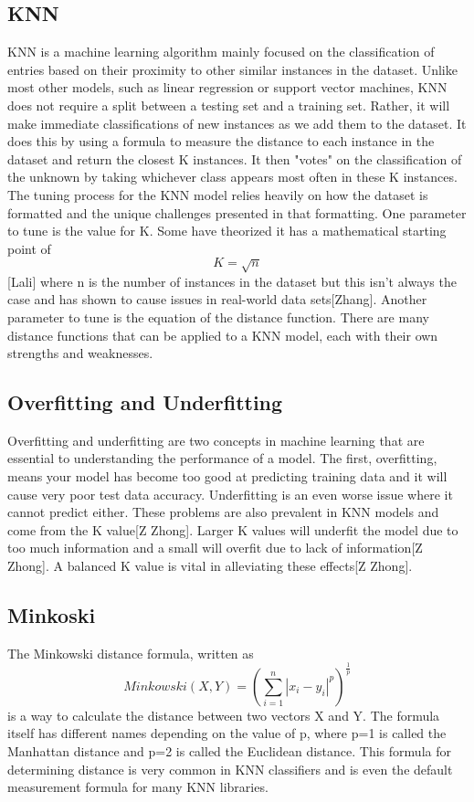 \documentclass[confrence]{IEEEtran}
\begin{document}
\subsection*{KNN}
KNN is a machine learning algorithm mainly focused on the classification of entries based on their proximity to other similar instances in the dataset.
Unlike most other models, such as linear regression or support vector machines, KNN does not require a split between a testing set and a training set.
Rather, it will make immediate classifications of new instances as we add them to the dataset.
It does this by using a formula to measure the distance to each instance in the dataset and return the closest K instances. It then "votes" on the classification of the unknown by taking whichever class appears most often in these K instances.
The tuning process for the KNN model relies heavily on how the dataset is formatted and the unique challenges presented in that formatting.
One parameter to tune is the value for K.
Some have theorized it has a mathematical starting point of \[K = \sqrt{n}\][Lali] where n is the number of instances in the dataset but this isn't always the case and has shown to cause issues in real-world data sets[Zhang].
Another parameter to tune is the equation of the distance function.
There are many distance functions that can be applied to a KNN model, each with their own strengths and weaknesses.
\subsection*{Overfitting and Underfitting}
Overfitting and underfitting are two concepts in machine learning that are essential to understanding the performance of a model.
The first, overfitting, means your model has become too good at predicting training data and it will cause very poor test data accuracy.
Underfitting is an even worse issue where it cannot predict either. These problems are also prevalent in KNN models and come from the K value[Z Zhong].
Larger K values will underfit the model due to too much information and a small will overfit due to lack of information[Z Zhong].
A balanced K value is vital in alleviating these effects[Z Zhong].
\subsection*{Minkoski}
The Minkowski distance formula, written as \[ Minkowski(X,Y) = (\sum_{i=1}^n|x_i-y_i|^p)^\frac{1}{p}\] is a way to calculate the distance between two vectors X and Y.
The formula itself has different names depending on the value of p, where p=1 is called the Manhattan distance and p=2 is called the Euclidean distance.
This formula for determining distance is very common in KNN classifiers and is even the default measurement formula for many KNN libraries.
\end{document}

